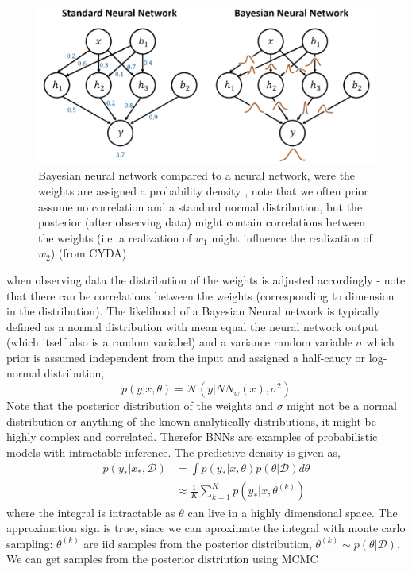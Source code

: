 \begin{figure}
    \centering
    \includegraphics[width=\textwidth]{Pictures/BNN_illustration.pdf}
    \caption*{Bayesian neural network compared to a neural network, were the weights are assigned a
    probability density , note that we often prior assume no correlation and a standard normal
    distribution, but the posterior (after observing data) might contain correlations between the
    weights (i.e. a realization of $w_1$ might influence the realization of $w_2$) (from CYDA)}
\end{figure}

when observing data the distribution of the weights is adjusted accordingly - note that 
there can be correlations between the weights (corresponding to dimension in the distribution). 
The likelihood of a Bayesian Neural network is typically defined as a normal distribution
with mean equal the neural network output (which itself also is a random variabel) and a 
variance random variable $\sigma$ which prior is assumed independent from the input and
assigned a half-caucy or log-normal distribution, 
$$p(y|x, \theta) = \mathcal{N}(y|NN_{w}(x),\sigma^2)$$
Note that the posterior distribution of the weights and $\sigma$ might not be a normal distribution
or anything of the known analytically distributions, it might be highly complex and correlated. 
Therefor BNNs are examples of probabilistic models with intractable inference. The predictive density is given as, 
\begin{align*}
    p(y_*|x_*,\mathcal{D}) &= \int p(y_*|x, \theta)p(\theta|\mathcal{D})d\theta\\
    &\approx \frac{1}{K} \sum_{k=1}^K p(y_*|x, \theta^{(k)})
\end{align*}
where the integral is intractable as $\theta$ can live in a highly dimensional space. The approximation sign
is true, since we can aproximate the integral with monte carlo sampling: $\theta^{(k)}$ are iid samples from the posterior 
distribution, $\theta^{(k)} \sim p(\theta|\mathcal{D})$. We can get samples from the posterior distriution using MCMC

